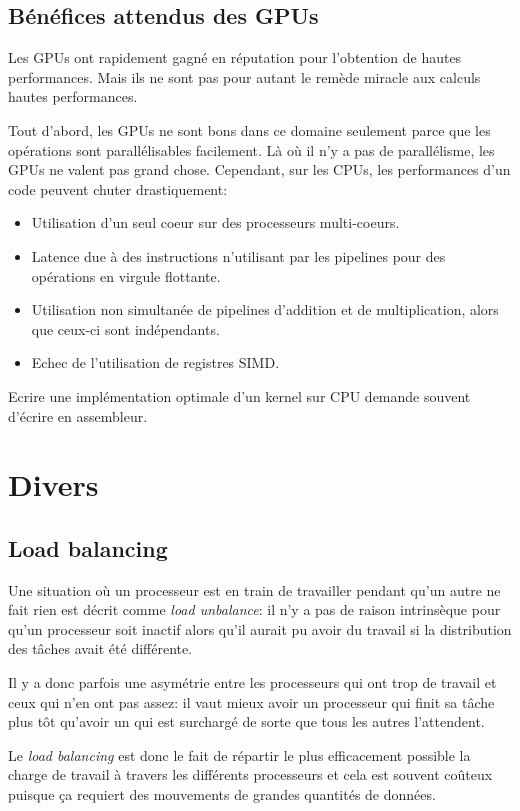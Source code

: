 	\subsection{Bénéfices attendus des GPUs}
	Les GPUs ont rapidement gagné en réputation pour l'obtention de hautes performances. Mais ils ne sont pas pour autant le remède miracle aux calculs hautes performances.
	
	Tout d'abord, les GPUs ne sont bons dans ce domaine seulement parce que les opérations sont parallélisables facilement. Là où il n'y a pas de parallélisme, les GPUs ne valent pas grand chose. Cependant, sur les CPUs, les performances d'un code peuvent chuter drastiquement:
\begin{itemize}
\item Utilisation d'un seul coeur sur des processeurs multi-coeurs.
\item Latence due à des instructions n'utilisant par les pipelines pour des opérations en virgule flottante. 
\item Utilisation non simultanée de pipelines d'addition et de multiplication, alors que ceux-ci sont indépendants.
\item Echec de l'utilisation de registres SIMD.
\end{itemize}		

Ecrire une implémentation optimale d'un kernel sur CPU demande souvent d'écrire en assembleur.
	
\section{Divers}
	\subsection{Load balancing}
	Une situation où un processeur est en train de travailler pendant qu'un autre ne fait rien est décrit comme \textit{load unbalance}: il n'y a pas de raison intrinsèque pour qu'un processeur soit inactif alors qu'il aurait pu avoir du travail si la distribution des tâches avait été différente.
	
	Il y a donc parfois une asymétrie entre les processeurs qui ont trop de travail et ceux qui n'en ont pas assez: il vaut mieux avoir un processeur qui finit sa tâche plus tôt qu'avoir un qui est surchargé de sorte que tous les autres l'attendent.
	
	Le \textit{load balancing} est donc le fait de répartir le plus efficacement possible la charge de travail à travers les différents processeurs et cela est souvent coûteux puisque ça requiert des mouvements de grandes quantités de données. 
	
